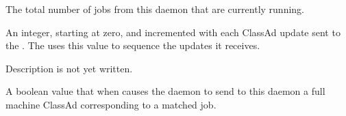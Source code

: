 \begin{description}
\item[\AdAttr{TotalRunningJobs}:] The total number of jobs from this
   daemon that are currently running.

\item[\AdAttr{UpdateSequenceNumber}:] An integer, starting at zero,
  and incremented with each ClassAd update sent to the .
  The  uses this value to sequence the updates it
  receives.

\item[\AdAttr{VirtualMemory}:] Description is not yet written.

\item[\AdAttr{WantResAd}:] A boolean value that when 
  causes the  daemon to send to this 
  daemon a full machine ClassAd corresponding to a matched job.

\end{description}

